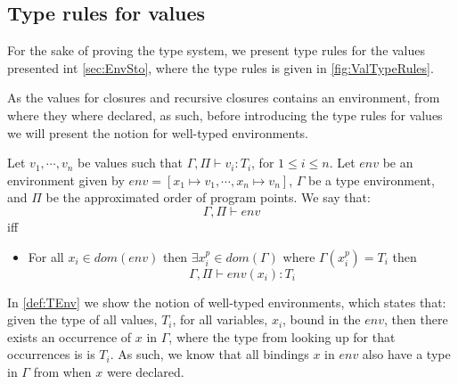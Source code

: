 \documentclass[../../master.tex]{subfiles}
\begin{document}
\subsection{Type rules for values}
For the sake of proving the type system, we present type rules for the values presented int \cref{sec:EnvSto}, where the type rules is given in \cref{fig:ValTypeRules}.

As the values for closures and recursive closures contains an environment, from where they where declared, as such, before introducing the type rules for values we will present the notion for well-typed environments.

\begin{definition}\label{def:TEnv}
	Let $v_1,\cdots,v_n$ be values such that $\Gamma,\Pi\vdash v_i:T_i$, for $1\leq i\leq n$.
	Let $env$ be an environment given by $env=[x_1\mapsto v_1,\cdots,x_n\mapsto v_n]$, $\Gamma$ be a type environment, and $\Pi$ be the approximated order of program points.
	We say that:
	$$\Gamma,\Pi\vdash env$$
	iff 
	\begin{itemize}
		\item For all $x_i\in dom(env)$ then $\exists x_i^p\in dom(\Gamma)$ where $\Gamma(x_i^p)=T_i$ then 
			$$\Gamma,\Pi\vdash env(x_i):T_i$$
	\end{itemize}
\end{definition}

In \cref{def:TEnv} we show the notion of well-typed environments, which states that: given the type of all values, $T_i$, for all variables, $x_i$, bound in the $env$, 
then there exists an occurrence of $x$ in $\Gamma$, where the type from looking up for that occurrences is is $T_i$.
As such, we know that all bindings $x$ in $env$ also have a type in $\Gamma$ from when $x$ were declared.
\end{document}
